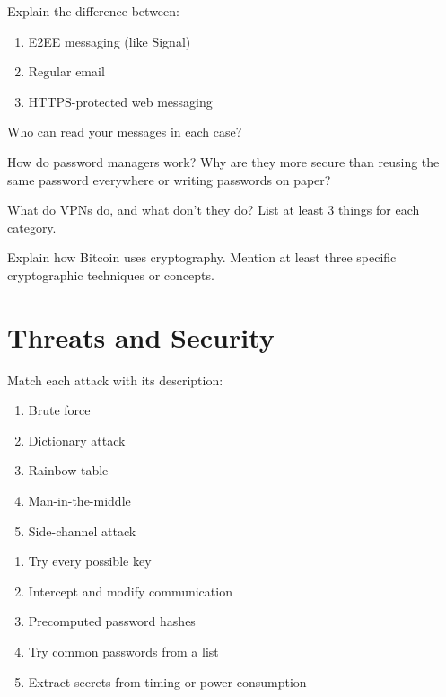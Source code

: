 \documentclass[11pt,a4paper]{report}
\begin{document}
\begin{ex}
Explain the difference between:
\begin{enumerate}[label=\alph*)]
    \item E2EE messaging (like Signal)
    \item Regular email
    \item HTTPS-protected web messaging
\end{enumerate}
Who can read your messages in each case?
\end{ex}

\begin{ex}
How do password managers work? Why are they more secure than reusing the same password everywhere or writing passwords on paper?
\end{ex}

\begin{ex}
What do VPNs do, and what don't they do? List at least 3 things for each category.
\end{ex}

\begin{ex}
Explain how Bitcoin uses cryptography. Mention at least three specific cryptographic techniques or concepts.
\end{ex}

\section{Threats and Security}

\begin{ex}
Match each attack with its description:

\begin{enumerate}[label=\alph*)]
    \item Brute force
    \item Dictionary attack
    \item Rainbow table
    \item Man-in-the-middle
    \item Side-channel attack
\end{enumerate}

\begin{enumerate}[label=\Roman*)]
    \item Try every possible key
    \item Intercept and modify communication
    \item Precomputed password hashes
    \item Try common passwords from a list
    \item Extract secrets from timing or power consumption
\end{enumerate}
\end{ex}
\end{document}
